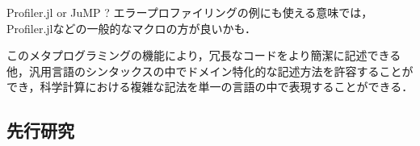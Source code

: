 Profiler.jl or JuMP ?
エラープロファイリングの例にも使える意味では，Profiler.jlなどの一般的なマクロの方が良いかも．

このメタプログラミングの機能により，冗長なコードをより簡潔に記述できる他，汎用言語のシンタックスの中でドメイン特化的な記述方法を許容することができ，科学計算における複雑な記法を単一の言語の中で表現することができる\cite{jeff-phd}\cite{DunningHuchetteLubin2017}．



\subsection{先行研究}

